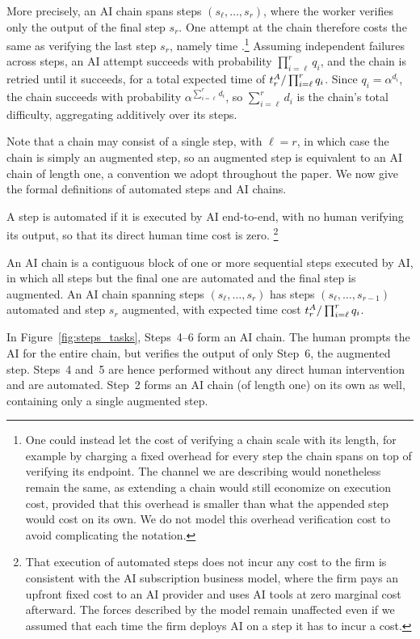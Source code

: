 More precisely, an AI chain spans steps $(s_\ell, \dotsc, s_r)$, where the worker verifies only the output of the final step $s_r$.
One attempt at the chain therefore costs the same as verifying the last step $s_r$, namely time .\footnote{
One could instead let the cost of verifying a chain scale with its length, for example by charging a fixed overhead for every step the chain spans on top of verifying its endpoint.
The channel we are describing would nonetheless remain the same, as extending a chain would still economize on execution cost, provided that this overhead is smaller than what the appended step would cost on its own.
We do not model this overhead verification cost to avoid complicating the notation.
}
Assuming independent failures across steps, an AI attempt succeeds with probability $\prod_{i=\ell}^{r} q_i$, and the chain is retried until it succeeds, for a total expected time of $t^{A}_{r}/\prod_{i=\ell}^{r} q_i$.
Since $q_i = \alpha^{d_i}$, the chain succeeds with probability $\alpha^{\sum_{i=\ell}^{r} d_i}$, so $\sum_{i=\ell}^{r} d_i$ is the chain's total difficulty, aggregating additively over its steps.

Note that a chain may consist of a single step, with $\ell = r$, in which case the chain is simply an augmented step, so an augmented step is equivalent to an AI chain of length one, a convention we adopt throughout the paper.
We now give the formal definitions of automated steps and AI chains.

\begin{definition}
\label{def:automated_step}
A step is automated if it is executed by AI end-to-end, with no human verifying its output, so that its direct human time cost is zero.%
\footnote{That execution of automated steps does not incur any cost to the firm is consistent with the AI subscription business model, where the firm pays an upfront fixed cost to an AI provider and uses AI tools at zero marginal cost afterward. The forces described by the model remain unaffected even if we assumed that each time the firm deploys AI on a step it has to incur a cost.}
\end{definition}

\begin{definition}[AI Chain]
\label{def:ai_chain}
An AI chain is a contiguous block of one or more sequential steps executed by AI, in which all steps but the final one are automated and the final step is augmented.
An AI chain spanning steps $(s_\ell,\dots,s_r)$ has steps $(s_\ell,\dots,s_{r-1})$ automated and step $s_r$ augmented, with expected time cost $t^{A}_{r}/\prod_{i=\ell}^{r} q_i$.
\end{definition}
In Figure~\ref{fig:steps_tasks}, Steps~4--6 form an AI chain. The human prompts the AI for the entire chain, but verifies the output of only Step~6, the augmented step. Steps~4 and~5 are hence performed without any direct human intervention and are automated.
Step~2 forms an AI chain (of length one) on its own as well, containing only a single augmented step.



